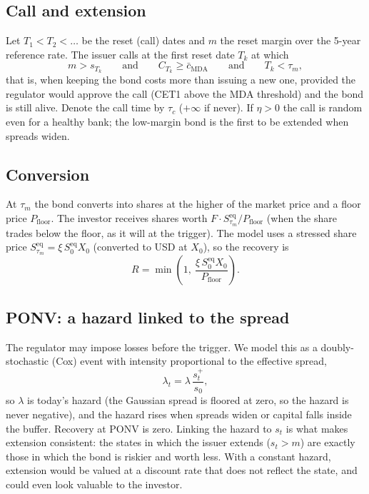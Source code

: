 \documentclass[11pt]{article}
\newcommand{\1}{\mathbf{1}}
\newcommand{\bmda}{\bar c_{\mathrm{MDA}}}
\begin{document}
\subsection{Call and extension}
Let $T_1<T_2<\dots$ be the reset (call) dates and $m$ the reset margin over the
5-year reference rate. The issuer calls at the first reset date $T_k$ at which
\begin{equation}\label{eq:call}
  m > s_{T_k}
  \qquad\text{and}\qquad C_{T_k}\ge \bmda
  \qquad\text{and}\qquad T_k<\tau_m ,
\end{equation}
that is, when keeping the bond costs more than issuing a new one, provided the
regulator would approve the call (CET1 above the MDA threshold) and the bond is
still alive. Denote the call time by $\tau_c$ ($+\infty$ if never). If
$\eta>0$ the call is random even for a healthy bank; the low-margin bond is the
first to be extended when spreads widen.

\subsection{Conversion}
At $\tau_m$ the bond converts into shares at the higher of the market price
and a floor price $P_{\mathrm{floor}}$. The investor receives shares worth
$F\cdot S^{\mathrm{eq}}_{\tau_m}/P_{\mathrm{floor}}$ (when the share trades
below the floor, as it will at the trigger). The model uses a stressed share
price $S^{\mathrm{eq}}_{\tau_m} = \xi\, S^{\mathrm{eq}}_0 X_0$ (converted to
USD at $X_0$), so the recovery is
\begin{equation}
  R = \min\!\left(1,\ \frac{\xi\,S^{\mathrm{eq}}_0 X_0}{P_{\mathrm{floor}}}\right).
\end{equation}

\subsection{PONV: a hazard linked to the spread}
The regulator may impose losses before the trigger. We model this as a
doubly-stochastic (Cox) event with intensity proportional to the effective
spread,
\begin{equation}\label{eq:hazard}
  \lambda_t = \lambda\,\frac{s_t^+}{s_0},
\end{equation}
so $\lambda$ is today's hazard (the Gaussian spread is floored at zero, so the
hazard is never negative), and the hazard rises when spreads widen or
capital falls inside the buffer. Recovery at PONV is zero. Linking the hazard to
$s_t$ is what makes extension consistent: the states in which the issuer
extends ($s_t>m$) are exactly those in which the bond is riskier and worth less.
With a constant hazard, extension would be valued at a discount rate that does
not reflect the state, and could even look valuable to the investor.
\end{document}
